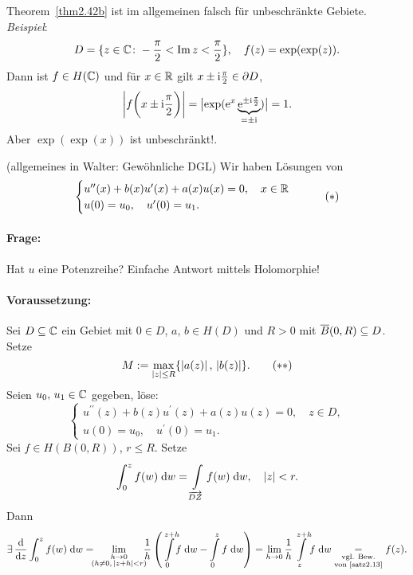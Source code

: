 \documentclass[a4paper,twoside,DIV15,BCOR12mm]{scrbook}
\begin{document}
\begin{bem*} Theorem~\ref{thm2.42b} ist im allgemeinen falsch für unbeschränkte Gebiete. \textit{Beispiel}:
\[D=\{z\in\mathbb{C}\colon -\frac{\pi}{2}<\operatorname{Im}{z}<\frac{\pi}{2}\},\quad f(z)=\exp(\exp(z)).\]
Dann ist $f\in H(\mathbb{C})$ und für $x\in\mathbb{R}$ gilt $x\pm\mathrm{i}\frac{\pi}{2}\in\partial D$,
\[\left\lvert f\biggl(x\pm\mathrm{i}\frac{\pi}{2}\biggr)\right\lvert=\bigl\lvert\exp(\mathrm{e}^x\underbrace{\mathrm{e}^{\pm\mathrm{i}\frac{\pi}{2}}}_{=\pm\mathrm{i}})\bigr\rvert=1.\]
Aber $\exp(\exp(x))$ ist unbeschränkt!.
\end{bem*}

\begin{bsp} (allgemeines in Walter: Gewöhnliche DGL) Wir haben Lösungen von
\[\label{2.43s}\begin{cases}u^{\prime\prime}(x)+b(x)u^\prime(x)+a(x)u(x)=0,\quad x\in\mathbb{R}\\u(0)=u_0,\quad u^\prime(0)=u_1.\end{cases}\tag{$*$}\]
\paragraph{Frage:} Hat $u$ eine Potenzreihe? Einfache Antwort mittels Holomorphie!
\vspace*{-12pt}\paragraph{Voraussetzung:} Sei $D\subseteq\mathbb{C}$ ein Gebiet mit $0\in D$, $a,\,b\in H(D)$ und $R>0$ mit $\overline{B}(0,R)\subseteq D$. Setze
\[\label{2.43ss}M:=\max_{\left\lvert z\right\lvert\leq R}\{\left\lvert a(z)\right\lvert,\,\left\lvert b(z)\right\lvert\}.\tag{$**$}\]
Seien $u_0,\,u_1\in\mathbb{C}$ gegeben, löse:
\begin{equation}\label{2.9}\begin{cases}
u^{\prime\prime}(z)+b(z)u^\prime(z)+a(z)u(z)=0,\quad z\in D,\\
u(0)=u_0,\quad u^\prime(0)=u_1.
\end{cases}\end{equation}
Sei $f\in H(B(0,R))$, $r\leq R$. Setze
\[\int_{0}^{z}{f(w)}\;\mathrm{d} w=\int\limits_{\overrightarrow{DZ}}^{}{f(w)}\;\mathrm{d}w,\quad\left\lvert z\right\lvert<r.\]
Dann
\[\exists\,\frac{\d}{\d z}\integral{0}{z}{f(w)}{w}=\!\!\!\lim_{\substack{h\to 0\\(h\neq 0,\,\abs{z+h}<r)}}\!\!\!\frac{1}{h}\left(\Integral{0}{z+h}{\!\!f}{w}-\Integral{0}{z}{f}{w}\right)=\lim_{h\to 0}\frac{1}{h}\Integral{z}{z+h}{\!f}{w}\underset{\substack{\text{vgl. Bew.}\\\text{von \ref{satz2.13}}}}{=}f(z).\]


\end{bsp}
\end{document}
